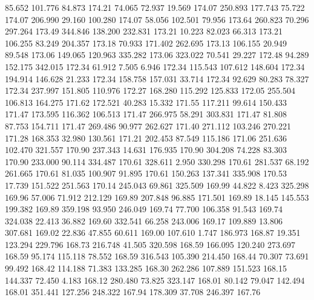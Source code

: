   85.652  101.776   84.873       174.21
  74.065   72.937   19.569       174.07
 250.893  177.743   75.722       174.07
 206.990   29.160  100.280       174.07
  58.056  102.501   79.956       173.64
 260.823   70.296  297.264       173.49
 344.846  138.200  232.831       173.21
  10.223   82.023   66.313       173.21
 106.255   83.249  204.357       173.18
  70.933  171.402  262.695       173.13
 106.155   20.949   89.548       173.06
 149.065  120.963  335.282       173.06
 323.022   70.541   29.227       172.48
  94.289  152.175  342.015       172.34
  61.912    7.505    6.946       172.34
 115.543  107.612  148.604       172.34
 194.914  146.628   21.233       172.34
 158.758  157.031   33.714       172.34
  92.629   80.283   78.327       172.34
 237.997  151.805  110.976       172.27
 168.280  115.292  125.833       172.05
 255.504  106.813  164.275       171.62
 172.521   40.283   15.332       171.55
 117.211   99.614  150.433       171.47
 173.595  116.362  106.513       171.47
 266.975   58.291  303.831       171.47
  81.808   87.753  154.711       171.47
 269.486   90.977  262.627       171.40
 271.112  103.246  270.221       171.28
 168.353   32.980  130.561       171.21
 202.453   87.549  115.186       171.06
 251.636  102.470  321.557       170.90
 237.343   14.631  176.935       170.90
 304.208   74.228   83.303       170.90
 233.000   90.114  334.487       170.61
 328.611    2.950  330.298       170.61
 281.537   68.192  261.665       170.61
  81.035  100.907   91.895       170.61
 150.263  137.341  335.908       170.53
  17.739  151.522  251.563       170.14
 245.043   69.861  325.509       169.99
  44.822    8.423  325.298       169.96
  57.006   71.912  212.129       169.89
 207.848   96.885  171.501       169.89
  18.145  145.553  199.382       169.89
 359.198   93.950  246.049       169.74
  77.700  106.358   91.543       169.74
 324.038   22.413   36.882       169.60
 332.541   66.258  243.006       169.17
 109.889   13.806  307.681       169.02
  22.836   47.855   60.611       169.00
 107.610    1.747  186.973       168.87
  19.351  123.294  229.796       168.73
 216.748   41.505  320.598       168.59
 166.095  120.240  273.697       168.59
  95.174  115.118   78.552       168.59
 316.543  105.390  214.450       168.44
  70.307   73.691   99.492       168.42
 114.188   71.383  133.285       168.30
 262.286  107.889  151.523       168.15
 144.337   72.450    4.183       168.12
 280.480   73.825  323.147       168.01
  80.142   79.047  142.494       168.01
 351.441  127.256  248.322       167.94
 178.309   37.708  246.397       167.76
